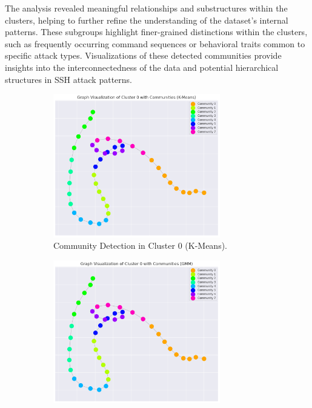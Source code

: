             The analysis revealed meaningful relationships and substructures within the clusters, helping to further refine the understanding of the dataset's internal patterns. These subgroups highlight finer-grained distinctions within the clusters, such as frequently occurring command sequences or behavioral traits common to specific attack types. Visualizations of these detected communities provide insights into the interconnectedness of the data and potential hierarchical structures in SSH attack patterns.
            
            \begin{figure}[H]
                \centering
                \begin{subfigure}[c]{0.47\textwidth}
                    \centering
                    \includegraphics[width=0.8\textwidth]{../figures/plots/section3/k-means_graph_visualization_of_cluster_0_with_communities.png}
                    \caption{Community Detection in Cluster 0 (K-Means).}
                    \label{fig:kmeans_graph}
                \end{subfigure}
                \hfill
                \begin{subfigure}[c]{0.47\textwidth}
                    \centering
                    \includegraphics[width=0.8\textwidth]{../figures/plots/section3/gmm_graph_visualization_of_cluster_0_with_communities.png}

\end{subfigure}
\end{figure}
